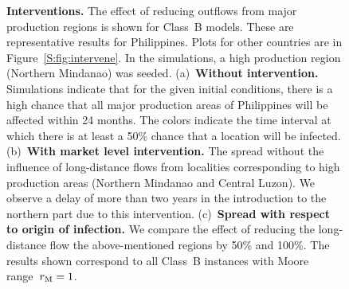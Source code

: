 \documentclass[11pt]{article}
\newcommand{\aacomment}[1]{({\color{magenta}AA: #1})}
\theoremstyle{definition}
\begin{document}
\begin{figure}[ht]
\begin{subfigure}[b]{.43\textwidth}
\caption{\label{fig:phlBContourBox}}
\end{subfigure}
\caption{\textbf{Interventions.} The effect of
reducing outflows from major production regions is shown for Class~B
models. These are representative results for Philippines. Plots for other
countries are in Figure~\ref{S:fig:intervene}. In the simulations, a high
production region (Northern Mindanao) was seeded. (a)~\textbf{Without
intervention.} Simulations indicate that for the given initial conditions,
there is a high chance that all major production areas of Philippines will
be affected within 24 months.  The colors indicate the time interval at
which there is at least a 50\% chance that a location will be infected.
(b)~\textbf{With market level intervention.} The spread without the
influence of long-distance flows from localities corresponding to high
production areas (Northern Mindanao and Central Luzon). We observe a delay
of more than two years in the introduction to the northern part due to this
intervention.  (c)~\textbf{Spread with respect to origin of infection.}
We compare the effect of reducing the long-distance flow the
above-mentioned regions by 50\% and 100\%. The results shown correspond to
all Class~B instances with Moore range~$r_\mathrm{M}=1$. \label{fig:intervene}}
\end{figure}
\end{document}
